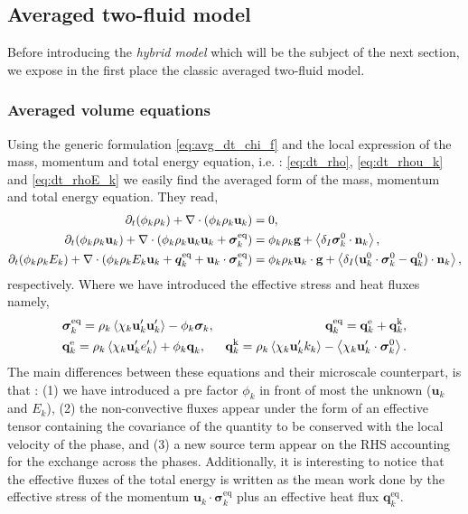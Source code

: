 \subsection{Averaged two-fluid model}
\label{ap:two-fluid_model}
Before introducing the \textit{hybrid model} which will be the subject of the next section, we expose in the first place the classic averaged two-fluid model. 

\subsubsection{Averaged volume equations}
Using the generic formulation \ref{eq:avg_dt_chi_f} and the local expression of the mass, momentum and total energy equation, i.e. : \ref{eq:dt_rho}, \ref{eq:dt_rhou_k} and \ref{eq:dt_rhoE_k} we easily find the averaged form of the mass, momentum and total energy equation.
They read, 
\begin{align}
    \label{eq:dt_avg_rho_k}
    \partial_t (\phi_k \rho_k)  
    + \mathbf{\nabla}\cdot (
        \phi_k \rho_k\textbf{u}_k
    )
    &= 
    0,\\
    \label{eq:dt_avg_rhou_k}
    \partial_t (\phi_k \rho_k\textbf{u}_k)  
    + \mathbf{\nabla}\cdot (
        \phi_k \rho_k\textbf{u}_k\textbf{u}_k
        + \bm{\sigma}_k^\text{eq}
    )
    &= 
    \phi_k \rho_k \textbf{g} 
    +  \left<\delta_I \bm{\sigma}_k^0 \cdot \textbf{n}_k\right>,\\
    \label{eq:dt_avg_rhoE_k}
    \partial_t (\phi_k\rho_kE_k)  
    + \mathbf{\nabla}\cdot (
        \phi_k\rho_kE_k\textbf{u}_k
        + \bm{q}_k^\text{eq}
        + \textbf{u}_k \cdot \bm{\sigma}_k^\text{eq}
        )
    &= 
    \phi_k \rho_k\textbf{u}_k \cdot \textbf{g} 
    + \left<\delta_I (\textbf{u}_k^0 \cdot \bm{\sigma}_k^0 - \textbf{q}_k^0)\cdot \textbf{n}_k\right>,
\end{align} 
respectively. 
Where we have introduced the effective stress and heat fluxes namely, 
\begin{align*}
    &\bm{\sigma}_k^\text{eq}
    = 
     \rho_k\avg{\chi_k \textbf{u}_k'\textbf{u}_k'}
      - \phi_k \bm{\sigma}_k,%
    &\textbf{q}_k^\text{eq}
    =\textbf{q}_k^\text{e} +\textbf{q}_k^\text{k},  \\
    &\textbf{q}_k^\text{e}
    = \rho_k \avg{\chi_k\textbf{u}_k' e_k'} 
    + \phi_k\textbf{q}_k,
    &\textbf{q}_k^\text{k}
    = \rho_k \avg{\chi_k \textbf{u}_k' k_k} 
    - \avg{\chi_k \textbf{u}_k' \cdot \bm{\sigma}_k^0}.
\end{align*}
The main differences between these equations and their microscale counterpart, is that : 
(1) we have introduced a pre factor $\phi_k$ in front of most the unknown  ($\textbf{u}_k$ and $E_k$), 
(2) the non-convective fluxes appear under the form of an effective tensor containing the covariance of the quantity to be conserved with the local velocity of the phase, 
and (3) a new source term appear on the RHS accounting for the exchange across the phases. 
Additionally, it is interesting to notice that the effective fluxes of the total energy is written as the mean work done by the effective stress of the momentum $\textbf{u}_k \cdot \bm{\sigma}_k^\text{eq}$ plus an effective heat flux $\bm{q}_k^\text{eq}$. 

